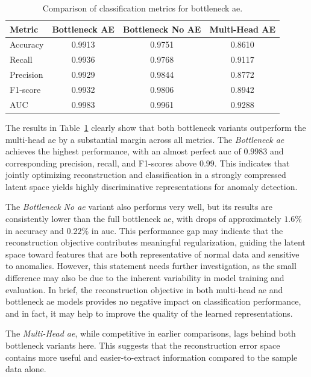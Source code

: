 \begin{table}[h!]
\centering
\caption{Comparison of classification metrics for bottleneck \gls{ae}.}
\label{tab:bottleneck-comparison}
\begin{tabular}{lccc}
    \toprule
    \textbf{Metric} & \textbf{Bottleneck AE} & \textbf{Bottleneck No AE} & \textbf{Multi-Head AE} \\
    \midrule
    Accuracy & 0.9913 & 0.9751 & 0.8610 \\
    Recall & 0.9936 & 0.9768 & 0.9117 \\
    Precision & 0.9929 & 0.9844 & 0.8772 \\ 
    F1-score & 0.9932 & 0.9806 & 0.8942 \\
    AUC & 0.9983 & 0.9961 & 0.9288 \\
    \bottomrule
\end{tabular}
\end{table}

The results in Table~\ref{tab:bottleneck-comparison} clearly show that both bottleneck variants outperform the multi-head \gls{ae} by a substantial margin across all metrics.
The \textit{Bottleneck \gls{ae}} achieves the highest performance, with an almost perfect \gls{auc} of $0.9983$ and corresponding precision, recall, and F1-scores above $0.99$.
This indicates that jointly optimizing reconstruction and classification in a strongly compressed latent space yields highly discriminative representations for anomaly detection.

The \textit{Bottleneck No \gls{ae}} variant also performs very well, but its results are consistently lower than the full bottleneck \gls{ae}, with drops of approximately $1.6\%$ in accuracy and $0.22\%$ in \gls{auc}.
This performance gap may indicate that the reconstruction objective contributes meaningful regularization, guiding the latent space toward features that are both representative of normal data and sensitive to anomalies.
However, this statement needs further investigation, as the small difference may also be due to the inherent variability in model training and evaluation.
In brief, the reconstruction objective in both multi-head \gls{ae} and bottleneck \gls{ae} models provides no negative impact on classification performance, and in fact, it may help to improve the quality of the learned representations.

The \textit{Multi-Head \gls{ae}}, while competitive in earlier comparisons, lags behind both bottleneck variants here.
This suggests that the reconstruction error space contains more useful and easier-to-extract information compared to the sample data alone.


